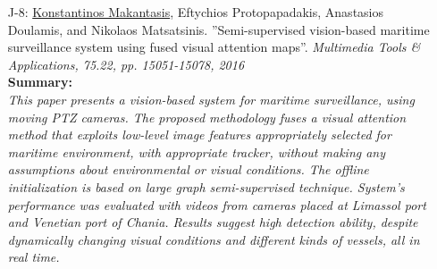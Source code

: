 \documentclass[a4paper,10pt]{article}
\begin{document}
\begin{itemize}
	\item [J-8:]\underline{Konstantinos Makantasis}, Eftychios Protopapadakis, Anastasios Doulamis, and Nikolaos Matsatsinis. ''Semi-supervised vision-based maritime surveillance system using fused visual attention maps''. \textit{Multimedia Tools \& Applications, 75.22, pp. 15051-15078, 2016}\\
	\textbf{Summary:}\\
	\textit{This paper presents a vision-based system for maritime surveillance, using moving PTZ cameras. The proposed methodology fuses a visual attention method that exploits low-level image features appropriately selected for maritime environment, with appropriate tracker, without making any assumptions about environmental or visual conditions. The offline initialization is based on large graph semi-supervised technique. System’s performance was evaluated with videos from cameras placed at Limassol port and Venetian port of Chania. Results suggest high detection ability, despite dynamically changing visual conditions and different kinds of vessels, all in real time.}
	

\end{itemize}
\end{document}

